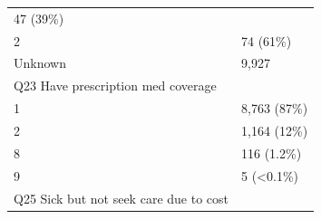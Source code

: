 \documentclass[]{article}
\begin{document}
\begin{longtable}[]{@{}ll@{}}
\begin{minipage}[t]{0.23\columnwidth}
47 (39\%)\strut
\end{minipage}\tabularnewline
\begin{minipage}[t]{0.71\columnwidth}\raggedright
2\strut
\end{minipage} & \begin{minipage}[t]{0.23\columnwidth}\raggedright
74 (61\%)\strut
\end{minipage}\tabularnewline
\begin{minipage}[t]{0.71\columnwidth}\raggedright
Unknown\strut
\end{minipage} & \begin{minipage}[t]{0.23\columnwidth}\raggedright
9,927\strut
\end{minipage}\tabularnewline
\begin{minipage}[t]{0.71\columnwidth}\raggedright
Q23 Have prescription med coverage\strut
\end{minipage} & \begin{minipage}[t]{0.23\columnwidth}\raggedright
\strut
\end{minipage}\tabularnewline
\begin{minipage}[t]{0.71\columnwidth}\raggedright
1\strut
\end{minipage} & \begin{minipage}[t]{0.23\columnwidth}\raggedright
8,763 (87\%)\strut
\end{minipage}\tabularnewline
\begin{minipage}[t]{0.71\columnwidth}\raggedright
2\strut
\end{minipage} & \begin{minipage}[t]{0.23\columnwidth}\raggedright
1,164 (12\%)\strut
\end{minipage}\tabularnewline
\begin{minipage}[t]{0.71\columnwidth}\raggedright
8\strut
\end{minipage} & \begin{minipage}[t]{0.23\columnwidth}\raggedright
116 (1.2\%)\strut
\end{minipage}\tabularnewline
\begin{minipage}[t]{0.71\columnwidth}\raggedright
9\strut
\end{minipage} & \begin{minipage}[t]{0.23\columnwidth}\raggedright
5 (\textless{}0.1\%)\strut
\end{minipage}\tabularnewline
\begin{minipage}[t]{0.71\columnwidth}\raggedright
Q25 Sick but not seek care due to cost\strut
\end{minipage} & \begin{minipage}[t]{0.23\columnwidth}\raggedright

\end{minipage}
\end{longtable}
\end{document}
